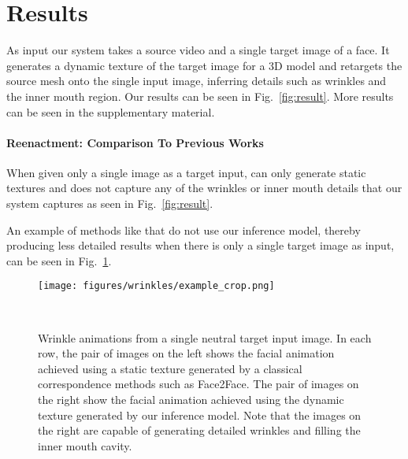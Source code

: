 \section{Results}

As input our system takes a source video and a single target image of a face. It generates a dynamic texture of the target image for a 3D model and retargets the source mesh onto the single input image, inferring details such as wrinkles and the inner mouth region.  Our results can be seen in Fig.~\ref{fig:result}. More results can be seen in the supplementary material.


\paragraph{Reenactment: Comparison To Previous Works}

When given only a single image as a target input, \cite{f2f} can only generate static textures and does not capture any of the wrinkles or inner mouth details that our system captures as seen in Fig.~\ref{fig:result}. 

An example of methods like \cite{f2f} that do not use our inference model, thereby producing less detailed results when there is only a single target image as input, can be seen in Fig.~\ref{fig:wrinkles}.


\begin{figure}[th]
	\centering
	\texttt{[image: figures/wrinkles/example\_crop.png]}
	\caption{Wrinkle animations from a single neutral target input image. In each row, the pair of images on the left shows the facial animation achieved using a static texture generated by a classical correspondence methods such as Face2Face. The pair of images on the right show the facial animation achieved using the dynamic texture generated by our inference model. Note that the images on the right are capable of generating detailed wrinkles and filling the inner mouth cavity.}~\label{fig:wrinkles}
	\vspace{-0.2in}
\end{figure}


